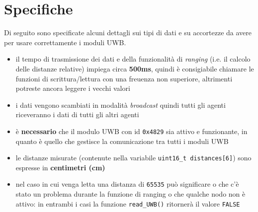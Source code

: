 \documentclass[a4paper, 12pt, titlepage]{article}
\numberwithin{equation}{section}
\numberwithin{figure}{section}
\begin{document}
\section{Specifiche}
    Di seguito sono specificate alcuni dettagli sui tipi di dati e su accortezze da avere per usare correttamente i moduli UWB.

    \begin{itemize}
        \item{il tempo di trasmissione dei dati e della funzionalità di \textit{ranging} (i.e. il calcolo delle distanze relative) impiega circa \textbf{500ms}, quindi è consigiabile chiamare le funzioni di scrittura/lettura con una freuenza non superiore, altrimenti potreste ancora leggere i vecchi valori}
    \item{i dati vengono scambiati in modalità \textit{broadcast} quindi tutti gli agenti riceveranno i dati di tutti gli altri agenti}
    \item{è \textbf{necessario} che il modulo UWB con id \texttt{0x4829} sia attivo e funzionante, in quanto è quello che gestisce la comunicazione tra tutti i moduli UWB}
    \item{le distanze misurate (contenute nella variabile \texttt{uint16\_t distances[6]}) sono espresse in \textbf{centimetri (cm)}}
    \item{nel caso in cui venga letta una distanza di \texttt{65535} può significare o che c'è stato un problema durante la funzione di ranging o che qualche nodo non è attivo: in entrambi i casi la funzione \texttt{read\_UWB()} ritornerà il valore \texttt{FALSE}}
    \end{itemize}
        
\end{document}
